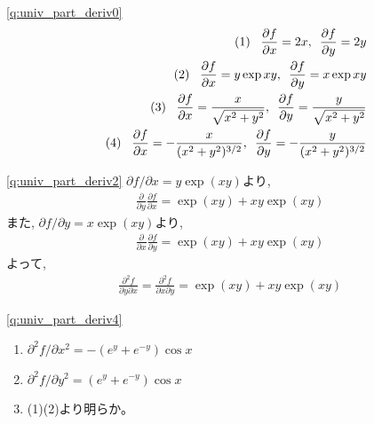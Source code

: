 \ref{q:univ_part_deriv0}  
\begin{eqnarray*}
&&\text{(1) \,\,\,} \frac{\partial f}{\partial x}=2x,\,\,\, \frac{\partial f}{\partial y}=2y\\
&&\text{(2) \,\,\,} \frac{\partial f}{\partial x}=y\exp xy,\,\,\, \frac{\partial f}{\partial y}=x \exp xy\\
&&\text{(3) \,\,\,} \frac{\partial f}{\partial x}=\frac{x}{\sqrt{x^2+y^2}},\,\,\, \frac{\partial f}{\partial y}=\frac{y}{\sqrt{x^2+y^2}}\\
&&\text{(4) \,\,\,} \frac{\partial f}{\partial x}=-\frac{x}{(x^2+y^2)^{3/2}},\,\,\, \frac{\partial f}{\partial y}=-\frac{y}{(x^2+y^2)^{3/2}}
\end{eqnarray*}
\mv

%
\ref{q:univ_part_deriv2}  $\partial f / \partial x=y\exp(xy)$より, 
\begin{eqnarray*}\frac{\partial}{\partial y}\frac{\partial f}{\partial x}=\exp(xy)+xy\exp(xy)\end{eqnarray*}
また, $\partial f / \partial y=x\exp(xy)$より, 
\begin{eqnarray*}\frac{\partial}{\partial x}\frac{\partial f}{\partial y}=\exp(xy)+xy\exp(xy)\end{eqnarray*}
よって, 
\begin{eqnarray*}\frac{\partial^2 f}{\partial y\partial x}=\frac{\partial^2 f}{\partial x\partial y}=\exp(xy)+xy\exp(xy)\end{eqnarray*}
\mv

\ref{q:univ_part_deriv4} 
\begin{enumerate}
\item $\partial^2 f/\partial x^2=-(e^y+e^{-y}) \cos x$
\item $\partial^2 f/\partial y^2=(e^y+e^{-y}) \cos x$
\item (1)(2)より明らか。
\end{enumerate}
\mv


